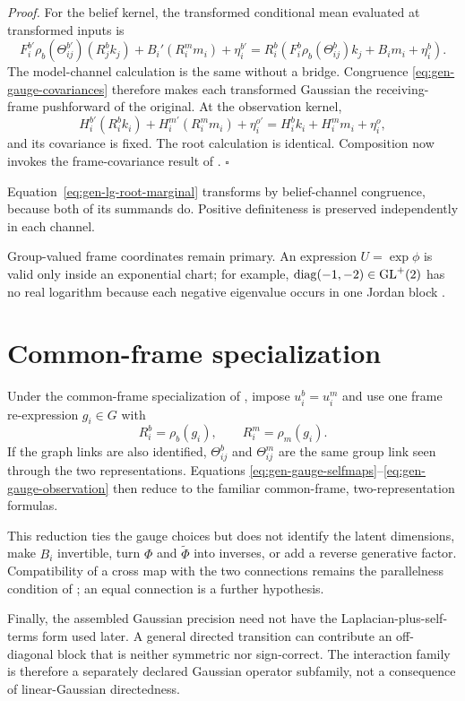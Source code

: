 \noindent\emph{Proof.}
For the belief kernel, the transformed conditional mean evaluated at transformed inputs is
\begin{equation}
F_i^{b\prime}\rho_b(\Theta_{ij}^{b\prime})(R_j^bk_j)
+B_i'(R_i^mm_i)+\eta_i^{b\prime}
=R_i^b\left(
F_i^b\rho_b(\Theta_{ij}^b)k_j+B_im_i+\eta_i^b
\right).
\label{eq:gen-gauge-mean-identity}
\end{equation}
The model-channel calculation is the same without a bridge.  Congruence
\eqref{eq:gen-gauge-covariances} therefore makes each transformed Gaussian the receiving-frame
pushforward of the original.  At the observation kernel,
\begin{equation}
H_i^{b\prime}(R_i^bk_i)+H_i^{m\prime}(R_i^mm_i)+\eta_i^{o\prime}
=H_i^bk_i+H_i^mm_i+\eta_i^o,
\label{eq:gen-gauge-observation-identity}
\end{equation}
and its covariance is fixed.  The root calculation is identical.  Composition now invokes the
frame-covariance result of . \hfill$\square$

Equation~\eqref{eq:gen-lg-root-marginal} transforms by belief-channel congruence, because both of
its summands do.  Positive definiteness is preserved independently in each channel.

Group-valued frame coordinates remain primary.  An expression $U=\exp\phi$ is valid only inside an
exponential chart; for example,
$\operatorname{diag}(-1,-2)\in\mathrm{GL}^+(2)$ has no real logarithm because each negative eigenvalue
occurs in one Jordan block \citep{culver1966existence}. 

\section{Common-frame specialization}
\label{sec:gen-gaussian-diagonal}

Under the common-frame specialization of , impose
$u_i^b=u_i^m$ and use one frame re-expression $g_i\in G$ with
\begin{equation}
R_i^b=\rho_b(g_i),
\qquad
R_i^m=\rho_m(g_i).
\label{eq:gen-gaussian-diagonal-action}
\end{equation}
If the graph links are also identified, $\Theta_{ij}^b$ and
$\Theta_{ij}^m$ are the same group link seen through the two
representations. Equations
\eqref{eq:gen-gauge-selfmaps}--\eqref{eq:gen-gauge-observation} then reduce to the familiar
common-frame, two-representation formulas. 

This reduction ties the gauge choices but does not identify the latent dimensions, make $B_i$
invertible, turn $\Phi$ and $\widetilde\Phi$ into inverses, or add a reverse generative factor.
Compatibility of a cross map with the two connections remains the parallelness
condition of ; an equal connection is a further hypothesis.

Finally, the assembled Gaussian precision need not have the Laplacian-plus-self-terms form used
later.  A general directed transition can contribute an off-diagonal block that is neither
symmetric nor sign-correct.  The interaction family is therefore a separately declared Gaussian
operator subfamily, not a consequence of linear-Gaussian directedness. 
